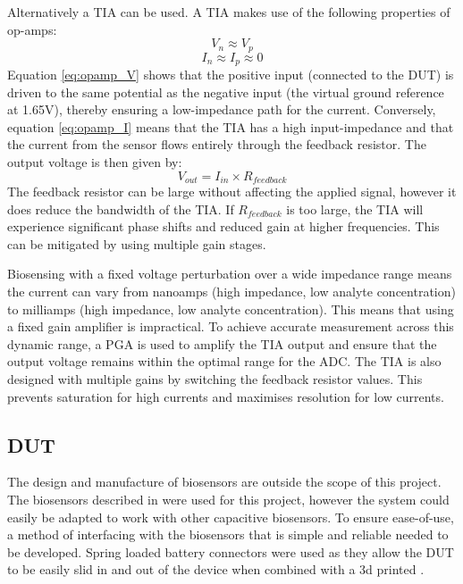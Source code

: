 Alternatively a \ac{TIA} can be used. A \ac{TIA} makes use of the following properties of op-amps:
\begin{equation}
    V_n \approx V_p
    \label{eq:opamp_V}
\end{equation}
\begin{equation}
    I_n \approx I_p \approx 0
    \label{eq:opamp_I}
\end{equation}
Equation \ref{eq:opamp_V} shows that the positive input (connected to the \ac{DUT}) is driven to the same potential as the negative input (the virtual ground reference at 1.65V), thereby ensuring a low-impedance path for the current. Conversely, equation \ref{eq:opamp_I} means that the TIA has a high input-impedance and that the current from the sensor flows entirely through the feedback resistor. The output voltage is then given by:
\begin{equation}
    V_{out}=I_{in} \times R_{feedback}
    \label{eq:tia_gain}
\end{equation}
The feedback resistor can be large without affecting the applied signal, however it does reduce the bandwidth of the TIA. If $R_{feedback}$ is too large, the TIA will experience significant phase shifts and reduced gain at higher frequencies. This can be mitigated by using multiple gain stages.

Biosensing with a fixed voltage perturbation over a wide impedance range means the current can vary from nanoamps (high impedance, low analyte concentration) to milliamps (high impedance, low analyte concentration). This means that using a fixed gain amplifier is impractical. To achieve accurate measurement across this dynamic range, a \ac{PGA} is used to amplify the TIA output and ensure that the output voltage remains within the optimal range for the \ac{ADC}. The TIA is also designed with multiple gains by switching the feedback resistor values. This prevents saturation for high currents and maximises resolution for low currents.

\subsection{DUT}
The design and manufacture of biosensors are outside the scope of this project. The biosensors described in \cite{ebrahimDevelopmentBiosensorEarly2023} were used for this project, however the system could easily be adapted to work with other capacitive biosensors. To ensure ease-of-use, a method of interfacing with the biosensors that is simple and reliable needed to be developed. Spring loaded battery connectors were used as they allow the DUT to be easily slid in and out of the device when combined with a 3d printed .

